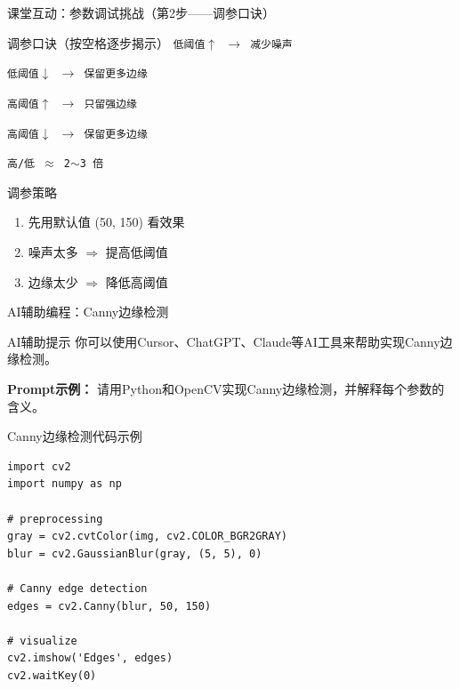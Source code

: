 \begin{frame}{课堂互动：参数调试挑战（第2步——调参口诀）}
    \begin{block}{调参口诀（按空格逐步揭示）}
        \pause
        \texttt{低阈值$\uparrow$ $\rightarrow$ 减少噪声} \pause

        \texttt{低阈值$\downarrow$ $\rightarrow$ 保留更多边缘} \pause

        \texttt{高阈值$\uparrow$ $\rightarrow$ 只留强边缘} \pause

        \texttt{高阈值$\downarrow$ $\rightarrow$ 保留更多边缘} \pause

        \texttt{高/低 $\approx$ 2$\sim$3 倍}
    \end{block}

    \pause
    \vspace{0.3cm}

    \begin{uncoverenv}
        \begin{block}{调参策略}
            \begin{enumerate}
                \item 先用默认值 (50, 150) 看效果
                \item 噪声太多 $\Rightarrow$ 提高低阈值
                \item 边缘太少 $\Rightarrow$ 降低高阈值
            \end{enumerate}
        \end{block}
    \end{uncoverenv}
\end{frame}

\begin{frame}{AI辅助编程：Canny边缘检测}
    \begin{block}{AI辅助提示}
        你可以使用Cursor、ChatGPT、Claude等AI工具来帮助实现Canny边缘检测。

        \textbf{Prompt示例：} 请用Python和OpenCV实现Canny边缘检测，并解释每个参数的含义。
    \end{block}
\end{frame}

\begin{frame}[fragile]{Canny边缘检测代码示例}
    \begin{lstlisting}[basicstyle=\ttfamily\scriptsize]
import cv2
import numpy as np

# preprocessing
gray = cv2.cvtColor(img, cv2.COLOR_BGR2GRAY)
blur = cv2.GaussianBlur(gray, (5, 5), 0)

# Canny edge detection
edges = cv2.Canny(blur, 50, 150)

# visualize
cv2.imshow('Edges', edges)
cv2.waitKey(0)
    \end{lstlisting}

\end{frame}

